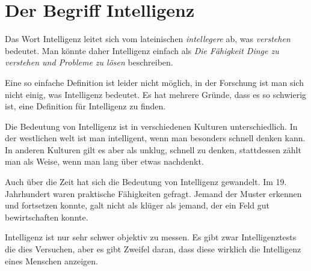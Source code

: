 \chapter{Der Begriff Intelligenz}

Das Wort Intelligenz leitet sich vom lateinischen \emph{intellegere} ab, was \emph{verstehen} bedeutet. Man könnte daher Intelligenz einfach als \emph{Die Fähigkeit Dinge zu verstehen und Probleme zu lösen} beschreiben.

Eine so einfache Definition ist leider nicht möglich, in der Forschung ist man sich nicht einig, was Intelligenz bedeutet. Es hat mehrere Gründe, dass es so schwierig ist, eine Definition für Intelligenz zu finden.

Die Bedeutung von Intelligenz ist in verschiedenen Kulturen unterschiedlich. In der westlichen welt ist man intelligent, wenn man besonders schnell denken kann. In anderen Kulturen gilt es aber als unklug, schnell zu denken, stattdessen zählt man als Weise, wenn man lang über etwas nachdenkt.

Auch über die Zeit hat sich die Bedeutung von Intelligenz gewandelt. Im 19. Jahrhundert waren praktische Fähigkeiten gefragt. Jemand der Muster erkennen und fortsetzen konnte, galt nicht als klüger als jemand, der ein Feld gut bewirtschaften konnte.

Intelligenz ist nur sehr schwer objektiv zu messen. Es gibt zwar Intelligenztests die dies Versuchen, aber es gibt Zweifel daran, dass diese wirklich die Intelligenz eines Menschen anzeigen.

